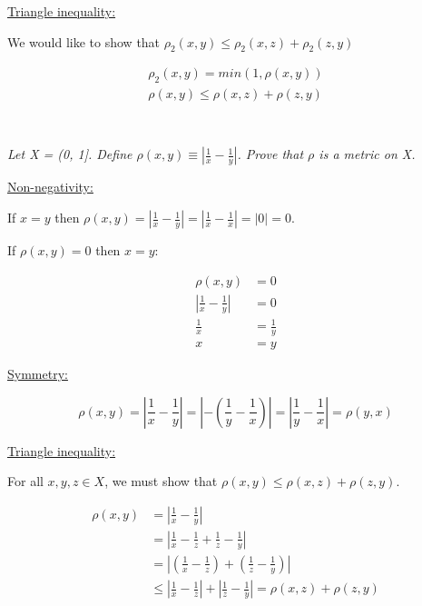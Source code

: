 \documentclass[]{article}
\begin{document}
			\underline{Triangle inequality:}


				We would like to show that $\rho_2(x, y) \leq \rho_2(x, z) + \rho_2(z, y)$

				\begin{align*}
					\rho_2(x, y) = min(1, \rho(x, y)) \\
					\rho(x, y) \leq \rho(x, z) + \rho(z, y) \\
				\end{align*}

	\section{}
		\textit{Let X = (0, 1]. Define $\rho(x, y) \equiv \left | \frac{1}{x} - \frac{1}{y} \right |$. Prove that $\rho$ is a metric on X.}

			\underline{Non-negativity:}

				If $x = y$ then $\rho(x, y) = \left | \frac{1}{x} - \frac{1}{y} \right | = \left | \frac{1}{x} - \frac{1}{x} \right | = \left | 0 \right | = 0$. 

				If $\rho(x, y) = 0$ then $x = y$: 

				\begin{align*}
					\rho(x, y) &= 0 \\
					\left | \frac{1}{x} - \frac{1}{y} \right | &= 0 \\
					\frac{1}{x} &= \frac{1}{y} \\
					x &= y
				\end{align*}

			\underline{Symmetry:}

				\[\rho(x, y) = \left | \frac{1}{x} - \frac{1}{y}\right | = \left | - \left (\frac{1}{y} - \frac{1}{x} \right ) \right | = \left | \frac{1}{y} - \frac{1}{x} \right | = \rho(y, x)\]

			\underline{Triangle inequality:}

				For all $x, y, z \in X$, we must show that $\rho(x, y) \leq \rho(x, z) + \rho(z, y)$. 

				\begin{align*}
					\rho(x,y) &= \left | \frac{1}{x} - \frac{1}{y} \right | \\
					&= \left | \frac{1}{x} - \frac{1}{z} + \frac{1}{z} - \frac{1}{y} \right | \\
					&= \left | \left (\frac{1}{x} - \frac{1}{z}\right ) + \left (\frac{1}{z} - \frac{1}{y}\right ) \right | \\ 
					&\leq \left | \frac{1}{x} - \frac{1}{z} \right | + \left | \frac{1}{z} - \frac{1}{y} \right | = \rho(x, z) + \rho(z, y)
				\end{align*}
\end{document}

